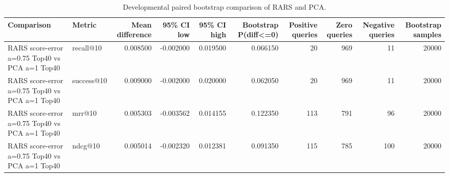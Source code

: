 \begin{table}[t]
\caption{Developmental paired bootstrap comparison of RARS and PCA.}
\label{tab:rars-significance}
\begin{tabular}{llrrrrrrrr}
\toprule
Comparison & Metric & Mean difference & 95\% CI low & 95\% CI high & Bootstrap P(diff<=0) & Positive queries & Zero queries & Negative queries & Bootstrap samples \\
\midrule
RARS score-error a=0.75 Top40 vs PCA a=1 Top40 & recall@10 & 0.008500 & -0.002000 & 0.019500 & 0.066150 & 20 & 969 & 11 & 20000 \\
RARS score-error a=0.75 Top40 vs PCA a=1 Top40 & success@10 & 0.009000 & -0.002000 & 0.020000 & 0.062050 & 20 & 969 & 11 & 20000 \\
RARS score-error a=0.75 Top40 vs PCA a=1 Top40 & mrr@10 & 0.005303 & -0.003562 & 0.014155 & 0.122350 & 113 & 791 & 96 & 20000 \\
RARS score-error a=0.75 Top40 vs PCA a=1 Top40 & ndcg@10 & 0.005014 & -0.002320 & 0.012381 & 0.091350 & 115 & 785 & 100 & 20000 \\
\bottomrule
\end{tabular}
\end{table}
